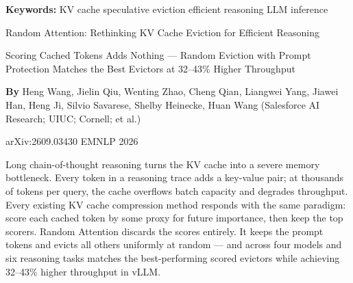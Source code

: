 \documentclass[10pt,twocolumn]{article}
\begin{document}
\setlength{\parindent}{0pt}
\setlength{\parskip}{4pt}

{\small\color{keywordgray}\textbf{Keywords:}
  KV cache \textbullet{}
  speculative eviction \textbullet{}
  efficient reasoning \textbullet{}
  LLM inference}\par\vspace{4pt}

{\LARGE\bfseries\raggedright
  Random Attention: Rethinking KV Cache Eviction
  for Efficient Reasoning}\par\vspace{4pt}

{\large\itshape\raggedright
  Scoring Cached Tokens Adds Nothing ---
  Random Eviction with Prompt Protection Matches
  the Best Evictors at 32--43\% Higher Throughput}\par\vspace{6pt}

{\small\textbf{By} Heng Wang, Jielin Qiu, Wenting Zhao, Cheng Qian,
  Liangwei Yang, Jiawei Han, Heng Ji, Silvio Savarese,
  Shelby Heinecke, Huan Wang
  (Salesforce AI Research; UIUC; Cornell; et al.)}\par\vspace{2pt}

{\small\color{keywordgray}arXiv:2609.03430 \textbullet{} EMNLP 2026}
\par\vspace{2pt}\noindent{\color{rulered}\rule{\columnwidth}{0.6pt}}\vspace{6pt}

Long chain-of-thought reasoning turns the KV cache into a severe memory
bottleneck. Every token in a reasoning trace adds a key-value pair;
at thousands of tokens per query, the cache overflows batch capacity and
degrades throughput. Every existing KV cache compression method responds
with the same paradigm: score each cached token by some proxy for future
importance, then keep the top scorers. Random Attention discards the
scores entirely. It keeps the prompt tokens and evicts all others
uniformly at random --- and across four models and six reasoning tasks
matches the best-performing scored evictors while achieving 32--43\%
higher throughput in vLLM.
\end{document}
